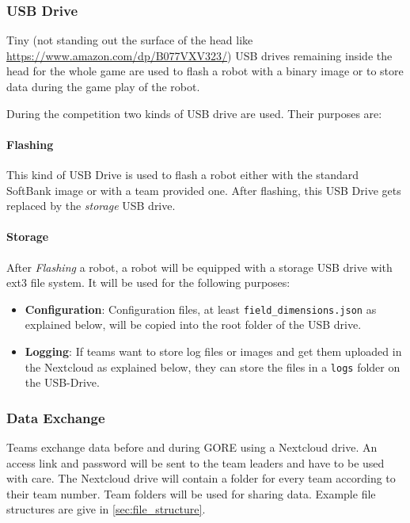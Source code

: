 \subsubsection{USB Drive}
\label{sec:c3_USB_Drive}
Tiny (not standing out the surface of the head like \url{https://www.amazon.com/dp/B077VXV323/}) USB drives remaining inside the head for the whole game are used to flash a robot with a binary image or to store data during the game play of the robot.

During the competition two kinds of USB drive are used. Their purposes are:

\paragraph*{Flashing}
This kind of USB Drive is used to flash a robot either with the standard SoftBank image or with a team provided one. After flashing, this USB Drive gets replaced by the \textit{storage} USB drive.

\paragraph*{Storage}
After \textit{Flashing} a robot, a robot will be equipped with a storage USB drive with ext3 file system. It will be used for the following purposes:

\begin{itemize}
	\item \textbf{Configuration}: Configuration files, at least \texttt{field\_dimensions.json} as explained below, will be copied into the root folder of the USB drive.
	\item  \textbf{Logging}: If teams want to store log files or images and get them uploaded in the Nextcloud as explained below, they can store the files in a \texttt{logs} folder on the USB-Drive.
\end{itemize}

\subsubsection{Data Exchange}
\label{sec:data_exchange}
Teams exchange data before and during GORE using a Nextcloud drive. An access link and password will be sent to the team leaders and have to be used with care. The Nextcloud drive will contain a folder for every team according to their team number. Team folders will be used for sharing data. Example file structures are give in \ref{sec:file_structure}. 

